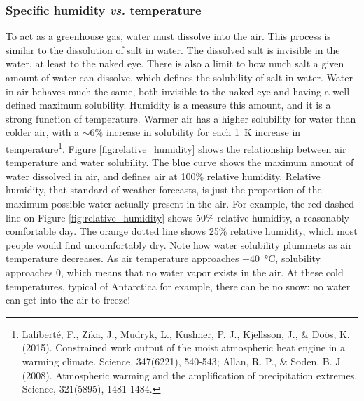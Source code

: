 \documentclass[amstex,12pt]{book}
\begin{document}
\subsubsection{Specific humidity \textit{vs.} temperature}
To act as a greenhouse gas, water must dissolve into the air. This process is similar to the dissolution of salt in water. The dissolved salt is invisible in the water, at least to the naked eye. There is also a limit to how much salt a given amount of water can dissolve, which defines the solubility of salt in water. Water in air behaves much the same, both invisible to the naked eye and having a well-defined maximum solubility. Humidity is a measure this amount, and it is a strong function of temperature. Warmer air has a higher solubility for water than colder air, with a $\sim 6\%$ increase in solubility for each \SI{1}{\kelvin} increase in temperature\footnote{Lalibert\'{e}, F., Zika, J., Mudryk, L., Kushner, P. J., Kjellsson, J., \& D\"{o}\"{o}s, K. (2015). Constrained work output of the moist atmospheric heat engine in a warming climate. Science, 347(6221), 540-543; Allan, R. P., \& Soden, B. J. (2008). Atmospheric warming and the amplification of precipitation extremes. Science, 321(5895), 1481-1484.}. Figure \ref{fig:relative_humidity} shows the relationship between air temperature and water solubility. The blue curve shows the maximum amount of water dissolved in air, and defines air at 100\% relative humidity. Relative humidity, that standard of weather forecasts, is just the proportion of the maximum possible water actually present in the air. For example, the red dashed line on Figure \ref{fig:relative_humidity} shows 50\% relative humidity, a reasonably comfortable day. The orange dotted line shows 25\% relative humidity, which most people would find uncomfortably dry. Note how water solubility plummets as air temperature decreases. As air temperature approaches \SI{-40}{\celsius}, solubility approaches 0, which means that no water vapor exists in the air. At these cold temperatures, typical of Antarctica for example, there can be no snow: no water can get into the air to freeze!\\
\end{document}
